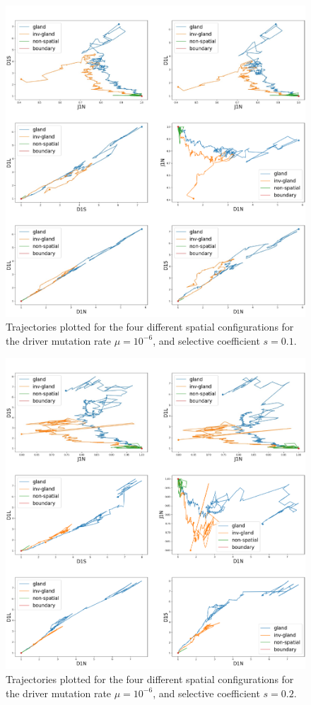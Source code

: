 \begin{figure}[h]
\centering
\includegraphics[width=\textwidth]{Chapter_3/figures/1e0601new.pdf}
\caption{Trajectories plotted for the four different spatial configurations for
    the driver mutation rate $\mu=10^{-6}$, and selective coefficient
    $s=0.1$.}
\label{fig:1e0601new}
\end{figure}

\begin{figure}[h]
\centering
\includegraphics[width=\textwidth]{Chapter_3/figures/1e0602new.pdf}
\caption{Trajectories plotted for the four different spatial configurations for
    the driver mutation rate $\mu=10^{-6}$, and selective coefficient
    $s=0.2$.}
\label{fig:1e0602new}
\end{figure}

